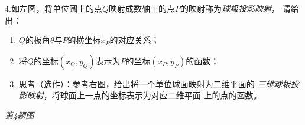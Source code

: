 \bs
4.如左图，将单位圆上的点$Q$映射成数轴上的点$P$的映射称为{\it 球极投影映射}，
  请给出：
  \begin{enumerate}[(1)]
    \item $Q$的极角$\theta$与$P$的横坐标$x_P$的对应关系；
    \item 将$Q$的坐标$(x_Q,y_Q)$表示为$P$的坐标$(x_P,y_P)$的函数；
    \item 思考（选作）：参考右图，给出将一个单位球面映射为二维平面的
    {\it 三维球极投影映射}，将球面上一点的坐标表示为对应二维平面
    上的点的函数。
  \end{enumerate}
\begin{center}
	\quad
	
	\it \small 第4题图
\end{center}

